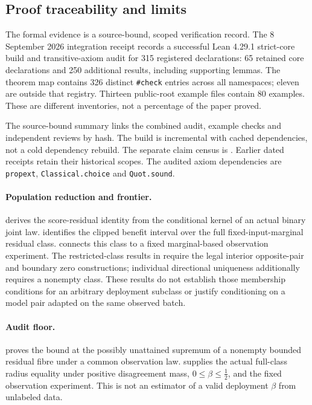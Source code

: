 \subsection{Proof traceability and limits}
\label{sec:proof-traceability}

The formal evidence is a source-bound, scoped verification record. The
8 September 2026 integration receipt records a successful Lean 4.29.1
strict-core build and transitive-axiom audit for 315 registered declarations:
65 retained core declarations and 250 additional results, including supporting
lemmas. The theorem map contains 326 distinct \texttt{\#check} entries across
all namespaces; eleven are outside that registry.
Thirteen public-root example files contain 80 examples.
These are different inventories, not a percentage of the paper proved.

The source-bound summary
links the combined audit, example checks and independent reviews by hash.
The build is incremental with cached dependencies, not a cold dependency rebuild.
The separate claim census is
.
Earlier dated receipts retain their historical scopes.
The audited axiom dependencies are \texttt{propext},
\texttt{Classical.choice} and \texttt{Quot.sound}.

\paragraph{Population reduction and frontier.}
 derives the score-residual identity
from the conditional kernel of an actual binary joint law.
 identifies the clipped
benefit interval over the full fixed-input-marginal residual class.
connects this class to a fixed marginal-based observation experiment.
The restricted-class results in  require the legal
interior opposite-pair and boundary zero constructions; individual directional
uniqueness additionally requires a nonempty class. These results do not establish
those membership conditions for an arbitrary deployment subclass or justify
conditioning on a model pair adapted on the same observed batch.

\paragraph{Audit floor.}
 proves the bound at the possibly unattained
supremum of a nonempty bounded residual fibre under a common observation law.
 supplies the actual
full-class radius equality under positive disagreement mass,
$0\le\beta\le\tfrac12$, and the fixed observation experiment. This is not an
estimator of a valid deployment $\beta$ from unlabeled data.

